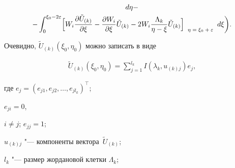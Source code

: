 \begin{multline}
  d \eta - \\

- \int _{0}^{\xi_0- 2\varepsilon}

\Bigl[

W_i \frac{\partial \tilde{U}_{(k)}}{\partial \xi} - \frac{\partial W_i}{\partial \xi} \tilde{U}_{(k)} - 2 W_i \frac{\Lambda_k}{\eta-\xi} \tilde{U}_{(k)}

\Bigr]

_{\scriptsize{

\begin{array}{l}

\eta=\xi_0+\varepsilon

 \end{array} }}

 d \xi

\biggr).

\end{multline}



Очевидно, $\tilde{U}_{(k)}(\xi_0,\eta_0)$ можно записать в виде 

\begin{gather}

\label{sum}

 \tilde{U}_{(k)}(\xi_0,\eta_0)=\sum\limits_{j=1}^{l_k} I(\lambda_k,u_{(k)j}) e_j,

\end{gather}

где $e_j=(e_{j1}, e_{j2},\dots ,e_{jl_{k}})^\top$; 

$e_{ji}=0$, 

$i\neq j$; $e_{jj}=1$;

$u_{(k)j}$ "--- компоненты вектора~$\tilde{U}_{(k)}$; 

$l_k$ "--- размер жордановой клетки $\Lambda_k$;

